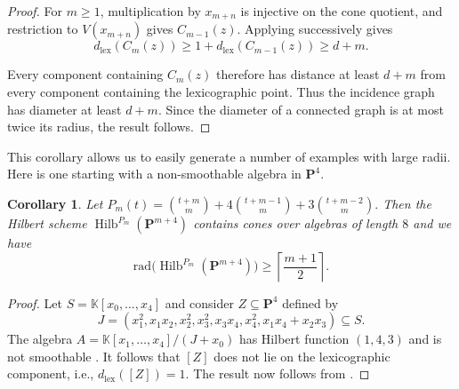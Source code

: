 \documentclass[leqno,11pt,a4paper]{amsart}
\newtheorem{cor}[cor]{Corollary}
\theoremstyle{definition}
\numberwithin{equation}{section}
\newcommand{\kk}{\mathbb{K}}
\newcommand{\lex}{\mathrm{lex}}
\newcommand{\rad}{\mathrm{rad}}
\newcommand{\PP}{\mathbf{P}}
\DeclareMathOperator{\Hilb}{Hilb}
\begin{document}
\begin{proof}
For $m\geq1$, multiplication by $x_{m+n}$ is injective on the cone quotient, and restriction to $V(x_{m+n})$ gives $C_{m-1}(z)$. Applying  successively gives
$$
d_{\lex}(C_m(z)) \geq1+d_{\lex}(C_{m-1}(z)) \geq d+m.
$$

Every component containing $C_m(z)$ therefore has distance at least $d+m$ from every component containing the lexicographic point. 
Thus the incidence graph has diameter at least $d+m$. 
Since the diameter of a connected graph is at most twice its radius, the result follows.
\end{proof}


This corollary allows us to easily generate a number of examples with large radii. Here is one starting with a non-smoothable algebra in $\PP^4$.

\begin{cor} Let $
P_m(t) = \binom{t+m}{m} +4\binom{t+m-1}{m} +3\binom{t+m-2}{m}.
$
Then the Hilbert scheme $\Hilb^{P_m}(\PP^{m+4})$ contains cones over algebras of length $8$ and we have $$
\rad\bigl(\Hilb^{P_m}(\PP^{m+4})\bigr) \geq\left\lceil\frac{m+1}{2}\right\rceil.
$$
\end{cor}
\begin{proof} 
Let $S =\kk[x_0,\dots,x_4]$ and consider $Z \subseteq \PP^4$ defined by
$$
J=(x_1^2,x_1x_2,x_2^2,x_3^2,x_3x_4,x_4^2, x_1x_4+x_2x_3) \subseteq S.
$$
The algebra $A = \kk[x_1,\dots,x_4]/(J+x_0)$ has Hilbert function $(1,4,3)$ and is not smoothable \cite[Exc. 5.8]{HarDeform}. 
It follows that $[Z]$ does not lie on the lexicographic component, i.e., $d_{\lex}([Z]) = 1$.
The result now follows from .
\end{proof}

 

\end{document}
